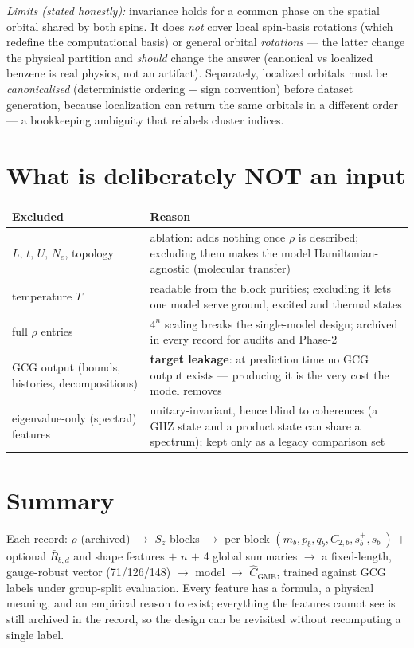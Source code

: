 \documentclass[11pt]{article}
\begin{document}
\emph{Limits (stated honestly):} invariance holds for a common phase on the
spatial orbital shared by both spins. It does \emph{not} cover local
spin-basis rotations (which redefine the computational basis) or general
orbital \emph{rotations} --- the latter change the physical partition and
\emph{should} change the answer (canonical vs localized benzene is real
physics, not an artifact). Separately, localized orbitals must be
\emph{canonicalised} (deterministic ordering + sign convention) before
dataset generation, because localization can return the same orbitals in a
different order --- a bookkeeping ambiguity that relabels cluster indices.

\section{What is deliberately NOT an input}
\begin{center}
\begin{tabular}{@{}lp{8.6cm}@{}}
\toprule
Excluded & Reason \\
\midrule
$L,\,t,\,U,\,N_e$, topology & ablation: adds nothing once $\rho$ is
  described; excluding them makes the model Hamiltonian-agnostic
  (molecular transfer) \\
temperature $T$ & readable from the block purities; excluding it lets one
  model serve ground, excited and thermal states \\
full $\rho$ entries & $4^n$ scaling breaks the single-model design;
  archived in every record for audits and Phase-2 \\
GCG output (bounds, histories, decompositions) & \textbf{target leakage}:
  at prediction time no GCG output exists --- producing it is the very cost
  the model removes \\
eigenvalue-only (spectral) features & unitary-invariant, hence blind to
  coherences (a GHZ state and a product state can share a spectrum); kept
  only as a legacy comparison set \\
\bottomrule
\end{tabular}
\end{center}

\section{Summary}
Each record: $\rho$ (archived) $\to$ $S_z$ blocks $\to$ per-block
$(m_b,p_b,q_b,C_{2,b},s^{+}_b,s^{-}_b)$ $+$ optional
$\bar R_{b,d}$ and shape features $+$ $n$ $+$ 4 global summaries $\to$ a
fixed-length, gauge-robust vector (71/126/148) $\to$ model $\to$
$\widehat C_{\mathrm{GME}}$, trained against GCG labels under
group-split evaluation. Every feature has a formula, a physical meaning, and
an empirical reason to exist; everything the features cannot see is still
archived in the record, so the design can be revisited without recomputing
a single label.
\end{document}
